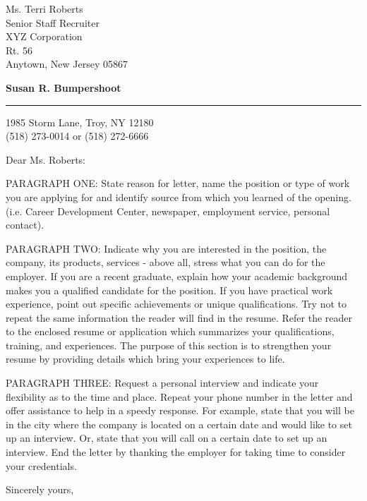 \documentclass{letter} %
\begin{document}
\signature{Susan R. Bumpershoot}           %
\longindentation=0pt                       %
\let\raggedleft\raggedright                %
 
 
\begin{letter}{Ms. Terri Roberts \\
Senior Staff Recruiter \\
XYZ Corporation \\
Rt. 56 \\
Anytown, New Jersey 05867}


\begin{flushleft}
{\large\bf Susan R. Bumpershoot}
\end{flushleft}
\medskip\hrule height 1pt
\begin{flushright}
\hfill 1985 Storm Lane, Troy, NY 12180 \\
\hfill (518) 273-0014 or (518) 272-6666 
\end{flushright} 
\vfill %

 
\opening{Dear Ms. Roberts:} 
 
\noindent PARAGRAPH ONE: State reason for letter, name the position or type 
of work you are applying for and identify source from  which  you 
learned   of   the  opening.  (i.e.  Career  Development  Center, 
newspaper, employment service, personal contact). 
 
\noindent PARAGRAPH  TWO:  Indicate why you are interested in the position, 
the company, its products, services - above all, stress what  you 
can  do  for  the employer. If you are a recent graduate, explain 
how your academic background makes you a qualified candidate  for 
the  position.  If  you have practical work experience, point out 
specific achievements or unique qualifications. Try not to repeat 
the  same  information  the reader will find in the resume. Refer 
the reader to the enclosed resume or application which summarizes 
your  qualifications,  training,  and experiences. The purpose of 
this section is to strengthen your resume  by  providing  details 
which bring your experiences to life. 
 
\noindent PARAGRAPH THREE: Request a personal interview and  indicate  your 
flexibility as to the time and place. Repeat your phone number in 
the letter and offer assistance to help in a speedy response. For 
example,  state that you will be in the city where the company is 
located on a certain date and would like to set up an  interview. 
Or,  state  that  you  will  call  on a certain date to set up an 
interview. End the letter by thanking  the  employer  for  taking 
time to consider your credentials. 
 
\closing{Sincerely yours,} 
 

 
\encl{}  				%

\end{letter}
 
\end{document}

